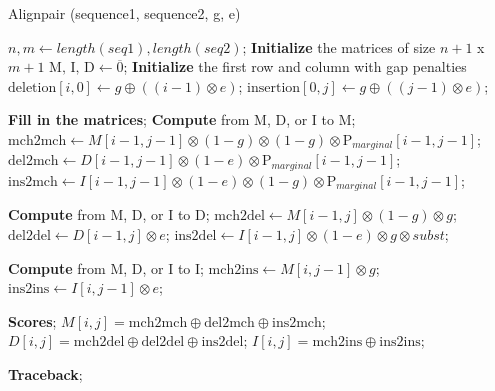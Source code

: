 \begin{algorithm}[H]
\caption{Alignpair (sequence1, sequence2, g, e)}
\begin{algorithmic}[1]
  \State $n, m \gets length(seq1), length(seq2)$;
  \State \textbf{Initialize} the matrices of size $n+1$ x $m+1$
  \State $\text{M, I, D} \gets \overline{0}$;
  \State \textbf{Initialize} the first row and column with gap penalties
    \State $\text{deletion}[i, 0] \gets g \oplus ((i - 1) \otimes e)$;
  \EndFor
    \State $\text{insertion}[0, j] \gets g \oplus ((j - 1) \otimes e)$;
  \EndFor

  \State \textbf{Fill in the matrices};
      \State \textbf{Compute} from M, D, or I to M;
      \State $\text{mch2mch} \gets M[i-1, j-1] \otimes (1-g) \otimes (1-g) \otimes \text{P}_{marginal}[i-1, j-1]$;
      \State $\text{del2mch} \gets D[i-1, j-1] \otimes (1-e) \otimes \text{P}_{marginal}[i-1, j-1]$;
      \State $\text{ins2mch} \gets I[i-1, j-1] \otimes (1-e) \otimes (1-g) \otimes \text{P}_{marginal}[i-1, j-1]$;

      \State \textbf{Compute} from M, D, or I to D;
      \State $\text{mch2del} \gets M[i-1, j] \otimes (1-g) \otimes g$;
      \State $\text{del2del} \gets D[i-1, j] \otimes e$;
      \State $\text{ins2del} \gets I[i-1, j] \otimes (1-e) \otimes g \otimes subst$;
      
      \State \textbf{Compute} from M, D, or I to I;
      \State $\text{mch2ins} \gets M[i, j-1] \otimes g$;
      \State $\text{ins2ins} \gets I[i, j-1] \otimes e$;
        
      \State \textbf{Scores};
      \State $M[i, j] = \text{mch2mch} \oplus \text{del2mch} \oplus \text{ins2mch}$;
      \State $D[i, j] = \text{mch2del} \oplus \text{del2del} \oplus \text{ins2del}$;
      \State $I[i, j] = \text{mch2ins} \oplus \text{ins2ins}$;

    \EndFor
  \EndFor
\State \textbf{Traceback};
\end{algorithmic}
\end{algorithm}
